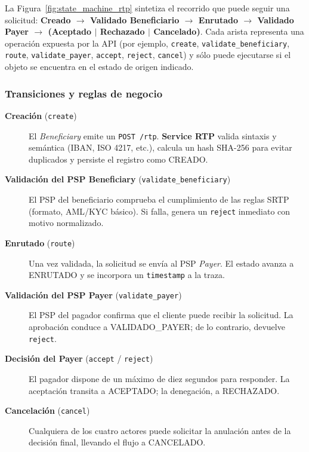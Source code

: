 La Figura~\ref{fig:state_machine_rtp} sintetiza el recorrido que puede seguir una solicitud:  
\textbf{Creado $\rightarrow$ Validado Beneficiario $\rightarrow$ Enrutado $\rightarrow$ Validado Payer $\rightarrow$ (Aceptado $|$ Rechazado $|$ Cancelado)}.  
Cada arista representa una operación expuesta por la API (por ejemplo, \texttt{create}, \texttt{validate\_beneficiary}, \texttt{route}, \texttt{validate\_payer}, \texttt{accept}, \texttt{reject}, \texttt{cancel}) y sólo puede ejecutarse si el objeto se encuentra en el estado de origen indicado.

\subsubsection{Transiciones y reglas de negocio}

\begin{description}
  \item[\textbf{Creación} (\texttt{create})]  
        El \emph{Beneficiary} emite un \texttt{POST /rtp}. \textbf{Service RTP} valida sintaxis y semántica (IBAN, ISO 4217, etc.), calcula un hash SHA-256 para evitar duplicados y persiste el registro como \textsc{CREADO}.
  \item[\textbf{Validación del PSP Beneficiary} (\texttt{validate\_beneficiary})]  
        El PSP del beneficiario comprueba el cumplimiento de las reglas SRTP (formato, AML/KYC básico). Si falla, genera un \texttt{reject} inmediato con motivo normalizado.
  \item[\textbf{Enrutado} (\texttt{route})]  
        Una vez validada, la solicitud se envía al PSP \emph{Payer}. El estado avanza a \textsc{ENRUTADO} y se incorpora un \texttt{timestamp} a la traza.
  \item[\textbf{Validación del PSP Payer} (\texttt{validate\_payer})]  
        El PSP del pagador confirma que el cliente puede recibir la solicitud. La aprobación conduce a \textsc{VALIDADO\_PAYER}; de lo contrario, devuelve \texttt{reject}.
  \item[\textbf{Decisión del Payer} (\texttt{accept} / \texttt{reject})]  
        El pagador dispone de un máximo de diez segundos para responder. La aceptación transita a \textsc{ACEPTADO}; la denegación, a \textsc{RECHAZADO}.
  \item[\textbf{Cancelación} (\texttt{cancel})]  
        Cualquiera de los cuatro actores puede solicitar la anulación antes de la decisión final, llevando el flujo a \textsc{CANCELADO}.
\end{description}

